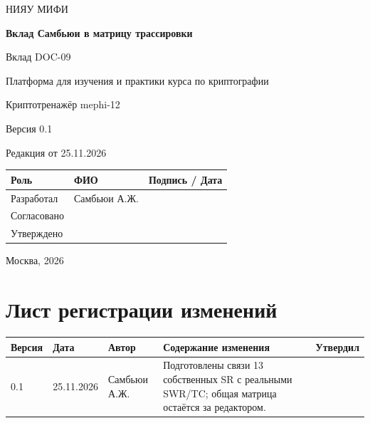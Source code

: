 \documentclass[12pt,a4paper]{article}
\begin{document}
\hypersetup{pageanchor=false}
\begin{titlepage}
  \thispagestyle{empty}
  \centering
  {\large НИЯУ МИФИ\par}
  \vspace*{3.5cm}
  {\LARGE\bfseries Вклад Самбьюи в матрицу трассировки\par}
  \vspace{0.5cm}
  {\large Вклад DOC-09\par}
  \vspace{0.6cm}
  {\large Платформа для изучения и практики курса по криптографии\par}
  {\large Криптотренажёр mephi-12\par}
  \vspace{0.7cm}
  {\large Версия 0.1\par}
  {\large Редакция от 25.11.2026\par}
  \vspace{1cm}
  \begin{tabularx}{\textwidth}{@{}p{3.4cm}Xp{4cm}@{}}
    \toprule
    Роль & ФИО & Подпись / Дата \\
    \midrule
    Разработал & Самбьюи А.Ж. & \\
    \addlinespace[6pt]
    Согласовано & & \\
    \addlinespace[6pt]
    Утверждено & & \\
    \bottomrule
  \end{tabularx}
  \vfill
  {\large Москва, 2026\par}
\end{titlepage}
\hypersetup{pageanchor=true}

\section*{Лист регистрации изменений}
\begingroup\small\singlespacing
\noindent
\begin{tabularx}{\textwidth}{@{}p{1.2cm}p{2cm}p{2.5cm}Xp{1.8cm}@{}}
\toprule
Версия & Дата & Автор & Содержание изменения & Утвердил \\
\midrule
0.1 & 25.11.2026 & Самбьюи А.Ж. & Подготовлены связи 13 собственных SR с реальными SWR/TC; общая матрица остаётся за редактором. & \\
\bottomrule
\end{tabularx}
\endgroup
\clearpage
\begingroup\small\singlespacing
\tableofcontents
\endgroup
\clearpage

\hypertarget{doc-09-вклад-самбьюи-в-матрицу-трассировки}{}
\end{document}
